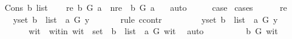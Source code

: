 \begin{isabellebody}
\isamarkupfalse%
\isanewline
\ \ \isamarkupfalse%
\ {\isacharparenleft}{\kern0pt}Cons\ b\ list{\isacharparenright}{\kern0pt}\isanewline
\ \ \isamarkupfalse%
\ {\isacharparenleft}{\kern0pt}re{\isacharparenright}{\kern0pt}\ {\isachardoublequoteopen}b\ {\isasymrightarrow}\isactrlsup {\isacharplus}{\kern0pt}\isactrlbsub G\isactrlesub \ a{\isachardoublequoteclose}\ {\isacharbar}{\kern0pt}\ {\isacharparenleft}{\kern0pt}nre{\isacharparenright}{\kern0pt}\ {\isachardoublequoteopen}{\isasymnot}\ b\ {\isasymrightarrow}\isactrlsup {\isacharplus}{\kern0pt}\isactrlbsub G\isactrlesub \ a\ {\isachardoublequoteclose}\ \isamarkupfalse%
\ auto\isanewline
\ \ \isamarkupfalse%
\ \isamarkupfalse%
\ {\isacharquery}{\kern0pt}case\ \isamarkupfalse%
{\isacharparenleft}{\kern0pt}cases{\isacharparenright}{\kern0pt}\isanewline
\ \ \ \ \isamarkupfalse%
\ re\isanewline
\ \ \ \ \isamarkupfalse%
\ {\isachardoublequoteopen}{\isacharparenleft}{\kern0pt}{\isasymforall}y{\isasymin}set\ {\isacharparenleft}{\kern0pt}b\ {\isacharhash}{\kern0pt}\ list{\isacharparenright}{\kern0pt}{\isachardot}{\kern0pt}\ {\isasymnot}\ a\ {\isasymrightarrow}\isactrlsup {\isacharplus}{\kern0pt}\isactrlbsub G\isactrlesub \ y\ {\isacharparenright}{\kern0pt}{\isachardoublequoteclose}\ \isanewline
\ \ \ \ \isamarkupfalse%
{\isacharparenleft}{\kern0pt}rule\ ccontr{\isacharparenright}{\kern0pt}\isanewline
\ \ \ \ \ \ \isamarkupfalse%
\ {\isachardoublequoteopen}{\isasymnot}\ {\isacharparenleft}{\kern0pt}{\isasymforall}y{\isasymin}set\ {\isacharparenleft}{\kern0pt}b\ {\isacharhash}{\kern0pt}\ list{\isacharparenright}{\kern0pt}{\isachardot}{\kern0pt}\ {\isasymnot}\ a\ {\isasymrightarrow}\isactrlsup {\isacharplus}{\kern0pt}\isactrlbsub G\isactrlesub \ y{\isacharparenright}{\kern0pt}{\isachardoublequoteclose}\isanewline
\ \ \ \ \ \ \isamarkupfalse%
\ \isamarkupfalse%
\ wit\ \ wit{\isacharunderscore}{\kern0pt}in{\isacharcolon}{\kern0pt}\ {\isachardoublequoteopen}wit\ {\isasymin}\ set\ \ {\isacharparenleft}{\kern0pt}b\ {\isacharhash}{\kern0pt}\ list{\isacharparenright}{\kern0pt}\ {\isasymand}\ a\ {\isasymrightarrow}\isactrlsup {\isacharplus}{\kern0pt}\isactrlbsub G\isactrlesub \ wit{\isachardoublequoteclose}\ \isamarkupfalse%
\ auto\isanewline
\ \ \ \ \ \ \isamarkupfalse%
\ \isamarkupfalse%
\ {\isachardoublequoteopen}b\ {\isasymrightarrow}\isactrlsup {\isacharplus}{\kern0pt}\isactrlbsub G\isactrlesub \ wit{\isachardoublequoteclose}\ \isamarkupfalse%

\end{isabellebody}
